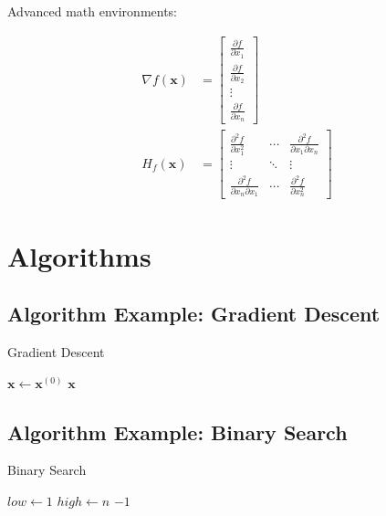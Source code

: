 \documentclass[12pt]{article}
\theoremstyle{definition}
\theoremstyle{remark}
\begin{document}
Advanced math environments:

\begin{align}
    \nabla f(\mathbf{x}) &= \begin{bmatrix}
        \frac{\partial f}{\partial x_1} \\
        \frac{\partial f}{\partial x_2} \\
        \vdots \\
        \frac{\partial f}{\partial x_n}
    \end{bmatrix} \\
    H_f(\mathbf{x}) &= \begin{bmatrix}
        \frac{\partial^2 f}{\partial x_1^2} & \cdots & \frac{\partial^2 f}{\partial x_1 \partial x_n} \\
        \vdots & \ddots & \vdots \\
        \frac{\partial^2 f}{\partial x_n \partial x_1} & \cdots & \frac{\partial^2 f}{\partial x_n^2}
    \end{bmatrix}
\end{align}

\section{Algorithms}

\subsection{Algorithm Example: Gradient Descent}

\begin{algorithm}[H]
\caption{Gradient Descent}\label{alg:gradient_descent}
$\mathbf{x} \gets \mathbf{x}^{(0)}$\;
\Return $\mathbf{x}$\;
\end{algorithm}

\subsection{Algorithm Example: Binary Search}

\begin{algorithm}[H]
\caption{Binary Search}\label{alg:binary_search}
$low \gets 1$\;
$high \gets n$\;
\Return $-1$\;
\end{algorithm}
\end{document}

